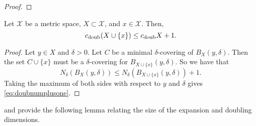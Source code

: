 \documentclass[../main.tex]{subfiles}
\newcommand{\set}[1]{\mathcal {#1}}
\newcommand{\doubnum}{c_\textnormal{doub}}
\begin{document}
\begin{proof}
%
\end{proof}

\begin{lemma}
    Let $\set X$ be a metric space, $X\subset\set X$, and $x\in\set X$.
    Then,
    \begin{equation}
        \label{eq:doubnumplusone}
        \doubnum (X\cup\{x\}) \le \doubnum X + 1.
    \end{equation}
\end{lemma}
\begin{proof}
    Let $y\in X$ and $\delta>0$.
    Let $C$ be a minimal $\delta$-covering of $B_X(y,\delta)$.
    Then the set $C\cup\{x\}$ must be a $\delta$-covering for $B_{X\cup\{x\}}(y,\delta)$.
    So we have that 
    \begin{equation}
        N_\delta(B_X(y,\delta)) \le N_\delta(B_{X\cup\{x\}}(y,\delta))+1
        .
    \end{equation}
    Taking the maximum of both sides with respect to $y$ and $\delta$ gives \eqref{eq:doubnumplusone}.
\end{proof}


\noindent
\citet{gupta2003bounded} and \cite{krauthgamer2004navigating} provide the following lemma relating the size of the expansion and doubling dimensions.
\end{document}
